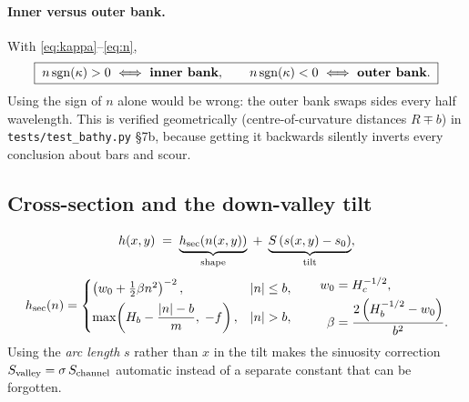 \documentclass[11pt,a4paper]{article}
\newcommand{\code}[1]{\texttt{\small #1}}
\begin{document}
\paragraph{Inner versus outer bank.} With \eqref{eq:kappa}--\eqref{eq:n},
\begin{equation}
  \boxed{\;n\,\mathrm{sgn}(\kappa)>0 \ \Longleftrightarrow\ \text{\bf inner bank},\qquad
         n\,\mathrm{sgn}(\kappa)<0 \ \Longleftrightarrow\ \text{\bf outer bank}.\;}
  \label{eq:innerouter}
\end{equation}
Using the sign of $n$ alone would be wrong: the outer bank swaps sides every half
wavelength. This is verified geometrically (centre-of-curvature distances $R\mp b$) in
\code{tests/test\_bathy.py} \S7b, because getting it backwards silently inverts every
conclusion about bars and scour.

\subsection{Cross-section and the down-valley tilt}
\begin{equation}
  h(x,y) \;=\; \underbrace{h_{\rm sec}\!\left(n(x,y)\right)}_{\text{shape}}
              \;+\; \underbrace{S\left(s(x,y)-s_0\right)}_{\text{tilt}},
  \label{eq:bed}
\end{equation}
\begin{equation}
  h_{\rm sec}(n)=
  \begin{cases}
    \left(w_0+\tfrac12\beta n^2\right)^{-2}, & |n|\le b,\\[4pt]
    \max\!\left(H_b-\dfrac{|n|-b}{m},\; -f\right), & |n|>b,
  \end{cases}
  \qquad
  \begin{aligned}
    w_0&=H_c^{-1/2},\\
    \beta&=\frac{2\left(H_b^{-1/2}-w_0\right)}{b^2}.
  \end{aligned}
  \label{eq:section}
\end{equation}
Using the \emph{arc length} $s$ rather than $x$ in the tilt makes the sinuosity correction
$S_{\rm valley}=\sigma\,S_{\rm channel}$ automatic instead of a separate constant that can
be forgotten.
\end{document}
